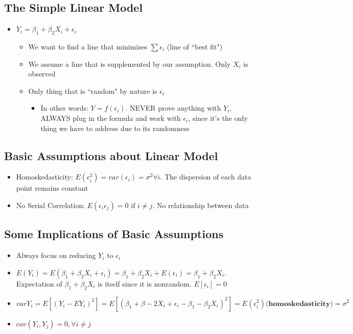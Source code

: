 \documentclass[10pt, oneside]{article}
\begin{document}
\subsection{The Simple Linear Model}
\begin{itemize}
    \item $Y_i =\beta_1 + \beta_2 X_i + \epsilon_i$
    \begin{itemize}
        \item We want to find a line that minimizes $\sum \epsilon_i$ (line of ``best fit")
        \item We assume a line that is supplemented by our assumption. Only $X_i$ is observed
        \item Only thing that is ``random" by nature is $\epsilon_i$
        \begin{itemize}
            \item In other words: $Y=f(\epsilon_i)$. NEVER prove anything with $Y_i$. ALWAYS plug in the formula and work with $\epsilon_i$, since it's the only thing we have to address due to its randomness
        \end{itemize}
    \end{itemize}
\end{itemize}

\subsection{Basic Assumptions about Linear Model}
\begin{itemize}
    \item Homoskedasticity: $E(\epsilon_i^2) = var(\epsilon_i) = \sigma^2 \forall i$. The dispersion of each data point remains constant
    \item No Serial Correlation: $E(\epsilon_i \epsilon_j) = 0$ if $i\neq j$. No relationship between data
\end{itemize}

\subsection{Some Implications of Basic Assumptions}
\begin{itemize}
    \item Always focus on reducing $Y_i$ to $\epsilon_i$
    \item $E(Y_i)=E(\beta_1 + \beta_2 X_i + \epsilon_i) =\beta_1 + \beta_2 X_i + E(\epsilon_i) =\beta_1+\beta_2 X_i$. Expectation of $\beta_1 + \beta_2 X_i$ is itself since it is nonrandom. $E[\epsilon_i]=0$
    \item $varY_i = E[(Y_i -EY_i)^2] = E[(\beta_1+\beta-2 X_i + \epsilon_i -\beta_1 -\beta_2 X_i)^2]=E(\epsilon_i ^2) \textbf{(homoskedasticity)}= \sigma ^2$
    \item $cov(Y_i, Y_j) = 0, \forall i \neq j$
\end{itemize}
\end{document}

